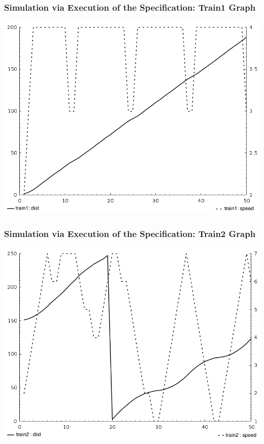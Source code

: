 \documentclass{beamer}
\begin{document}
\begin{frame}
\frametitle{Simulation via Execution of the Specification: Train1 Graph}
\begin{center}
\includegraphics[scale=0.3]{t1graph.png}
\end{center}
\end{frame}

\begin{frame}
\frametitle{Simulation via Execution of the Specification: Train2 Graph}
\begin{center}
\includegraphics[scale=0.3]{t2graph.png}
\end{center}
\end{frame}
\end{document}
